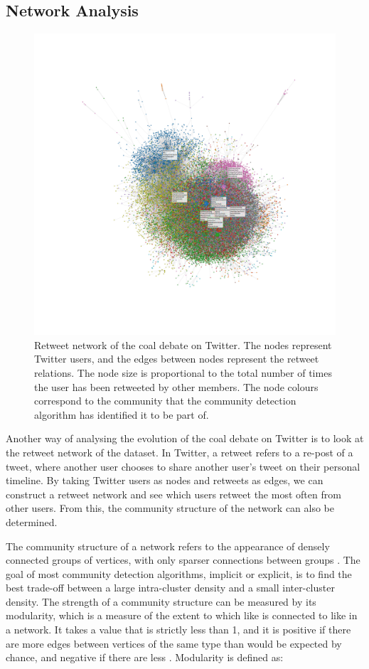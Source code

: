 \documentclass[12pt,onecolumn,twoside]{layout}
\begin{document}
\subsection*{Network Analysis}
\begin{figure} 
	\begin{center}
		\includegraphics[width=0.8\linewidth]{figures/rt_network_ht}
	\end{center}
	\caption{Retweet network of the coal debate on Twitter. The nodes represent Twitter users, and the edges between nodes represent the retweet relations. The node size is proportional to the total number of times the user has been retweeted by other members. The node colours correspond to the community that the community detection algorithm has identified it to be part of.}
	\label{fig:rt_network}
\end{figure}	


Another way of analysing the evolution of the coal debate on Twitter is to look at the retweet network of the dataset. In Twitter, a retweet refers to a re-post of a tweet, where another user chooses to share another user's tweet on their personal timeline. By taking Twitter users as nodes and retweets as edges, we can construct a retweet network and see which users retweet the most often from other users. From this, the community structure of the network can also be determined. 

The community structure of a network refers to the appearance of densely connected groups of vertices, with only sparser connections between groups \cite{Newman8577}. The goal of most community detection algorithms, implicit or explicit, is to find the best trade-off between a large intra-cluster density and a small inter-cluster density. The strength of a community structure can be measured by its modularity, which is a measure of the extent to which like is connected to like in a network. It takes a value that is strictly less than 1, and it is positive if there are more edges between vertices of the same type than would be expected by chance, and negative if there are less \cite{Newman8577}. Modularity is defined as: 
\end{document}
